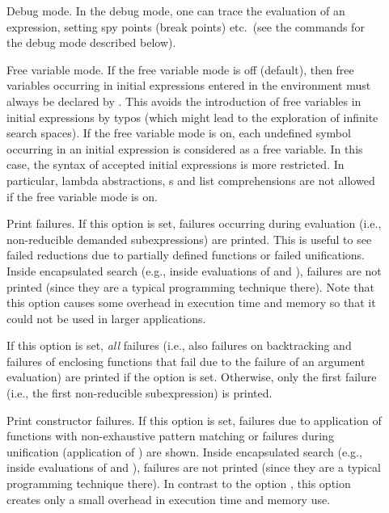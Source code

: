\begin{description}
\item[] Debug mode.
In the debug mode, one can trace the evaluation of an expression,
setting spy points (break points) etc.\ (see the commands
for the debug mode described below).

\item[]
Free variable mode.
If the free variable mode is off (default), then
free variables occurring in initial expressions entered in the
\CYS environment must always be declared by .
This avoids the introduction of free variables in initial expressions
by typos (which might lead to the exploration of infinite search spaces).
If the free variable mode is on, each undefined symbol occurring
in an initial expression is considered as a free variable.
In this case, the syntax of accepted initial expressions
is more restricted.
In particular, lambda abstractions, s and list comprehensions
are not allowed if the free variable mode is on.

\item[] Print failures.
If this option is set, failures occurring during evaluation
(i.e., non-reducible demanded subexpressions) are printed.
This is useful to see failed reductions due to partially
defined functions or failed unifications.
Inside encapsulated search (e.g., inside evaluations of
 and ), failures are not printed
(since they are a typical programming technique there).
Note that this option causes some overhead in execution time
and memory so that it could not be used in larger applications.

\item[]
If this option is set, \emph{all} failures
(i.e., also failures on backtracking and failures
of enclosing functions that fail due to the failure of an argument
evaluation) are printed if the option  is set.
Otherwise, only the first failure (i.e., the first non-reducible
subexpression) is printed.

\item[] Print constructor failures.
If this option is set, failures due to application of
functions with non-exhaustive pattern matching or failures
during unification (application of \ccode{=:=}) are shown.
Inside encapsulated search (e.g., inside evaluations of
 and ), failures are not printed
(since they are a typical programming technique there).
In contrast to the option ,
this option creates only a small overhead in execution time
and memory use.


\end{description}
